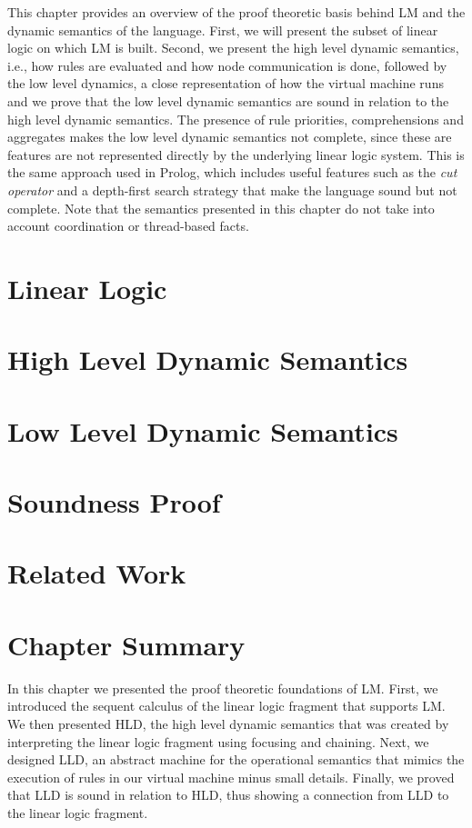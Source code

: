 This chapter provides an overview of the proof theoretic basis behind LM and the
dynamic semantics of the language. First, we will present the subset of linear
logic on which LM is built. Second, we present the high level dynamic semantics,
i.e., how rules are evaluated and how node communication is done, followed by
the low level dynamics, a close representation of how the virtual machine runs
and we prove that the low level dynamic semantics are sound in relation to the
high level dynamic semantics. The presence of rule priorities, comprehensions
and aggregates makes the low level dynamic semantics not complete, since these
are features are not represented directly by the underlying linear logic system.
This is the same approach used in Prolog, which includes useful features such as
the \emph{cut operator} and a depth-first search strategy that make the language
sound but not complete. Note that the semantics presented in this chapter do not
take into account coordination or thread-based facts.

\section{Linear Logic}


\section{High Level Dynamic Semantics}



\section{Low Level Dynamic Semantics}

\section{Soundness Proof}

\section{Related Work}

\section{Chapter Summary}

In this chapter we presented the proof theoretic foundations of LM.  First, we
introduced the sequent calculus of the linear logic fragment that supports LM. We then
presented HLD, the high level dynamic semantics that was created by interpreting
the linear logic fragment using focusing and chaining. Next, we designed LLD,
an abstract machine for the operational semantics that mimics the execution of
rules in our virtual machine minus small details.  Finally, we proved that LLD is sound
in relation to HLD, thus showing a connection from LLD to the linear logic
fragment.

